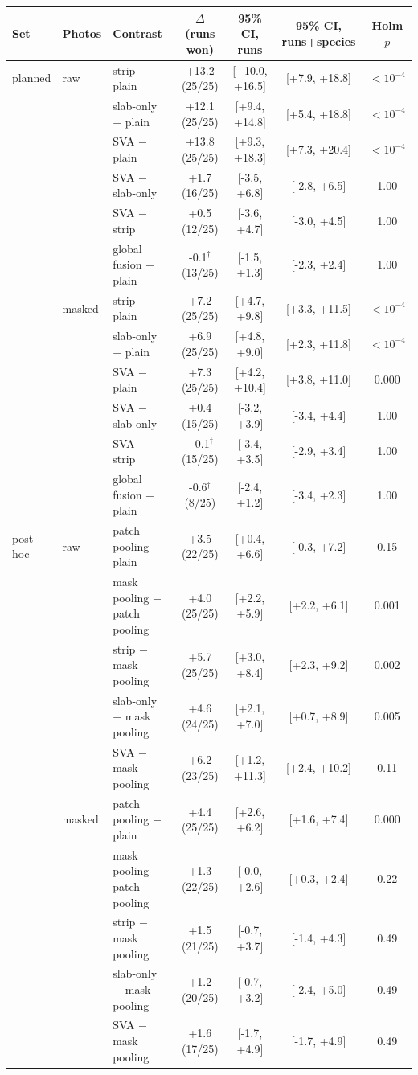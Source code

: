 \begin{tabular}{lllcccc}
\toprule
Set & Photos & Contrast & $\Delta$ (runs won) & 95\% CI, runs & 95\% CI, runs+species & Holm $p$ \\
\midrule
planned & raw & strip $-$ plain & +13.2 (25/25) & [+10.0, +16.5] & [+7.9, +18.8] & $<10^{-4}$ \\
 &  & slab-only $-$ plain & +12.1 (25/25) & [+9.4, +14.8] & [+5.4, +18.8] & $<10^{-4}$ \\
 &  & SVA $-$ plain & +13.8 (25/25) & [+9.3, +18.3] & [+7.3, +20.4] & $<10^{-4}$ \\
 &  & SVA $-$ slab-only & +1.7 (16/25) & [-3.5, +6.8] & [-2.8, +6.5] & 1.00 \\
 &  & SVA $-$ strip & +0.5 (12/25) & [-3.6, +4.7] & [-3.0, +4.5] & 1.00 \\
 &  & global fusion $-$ plain & -0.1$^\dagger$ (13/25) & [-1.5, +1.3] & [-2.3, +2.4] & 1.00 \\
\midrule
 & masked & strip $-$ plain & +7.2 (25/25) & [+4.7, +9.8] & [+3.3, +11.5] & $<10^{-4}$ \\
 &  & slab-only $-$ plain & +6.9 (25/25) & [+4.8, +9.0] & [+2.3, +11.8] & $<10^{-4}$ \\
 &  & SVA $-$ plain & +7.3 (25/25) & [+4.2, +10.4] & [+3.8, +11.0] & 0.000 \\
 &  & SVA $-$ slab-only & +0.4 (15/25) & [-3.2, +3.9] & [-3.4, +4.4] & 1.00 \\
 &  & SVA $-$ strip & +0.1$^\dagger$ (15/25) & [-3.4, +3.5] & [-2.9, +3.4] & 1.00 \\
 &  & global fusion $-$ plain & -0.6$^\dagger$ (8/25) & [-2.4, +1.2] & [-3.4, +2.3] & 1.00 \\
\midrule
post hoc & raw & patch pooling $-$ plain & +3.5 (22/25) & [+0.4, +6.6] & [-0.3, +7.2] & 0.15 \\
 &  & mask pooling $-$ patch pooling & +4.0 (25/25) & [+2.2, +5.9] & [+2.2, +6.1] & 0.001 \\
 &  & strip $-$ mask pooling & +5.7 (25/25) & [+3.0, +8.4] & [+2.3, +9.2] & 0.002 \\
 &  & slab-only $-$ mask pooling & +4.6 (24/25) & [+2.1, +7.0] & [+0.7, +8.9] & 0.005 \\
 &  & SVA $-$ mask pooling & +6.2 (23/25) & [+1.2, +11.3] & [+2.4, +10.2] & 0.11 \\
\midrule
 & masked & patch pooling $-$ plain & +4.4 (25/25) & [+2.6, +6.2] & [+1.6, +7.4] & 0.000 \\
 &  & mask pooling $-$ patch pooling & +1.3 (22/25) & [-0.0, +2.6] & [+0.3, +2.4] & 0.22 \\
 &  & strip $-$ mask pooling & +1.5 (21/25) & [-0.7, +3.7] & [-1.4, +4.3] & 0.49 \\
 &  & slab-only $-$ mask pooling & +1.2 (20/25) & [-0.7, +3.2] & [-2.4, +5.0] & 0.49 \\
 &  & SVA $-$ mask pooling & +1.6 (17/25) & [-1.7, +4.9] & [-1.7, +4.9] & 0.49 \\
\bottomrule
\end{tabular}